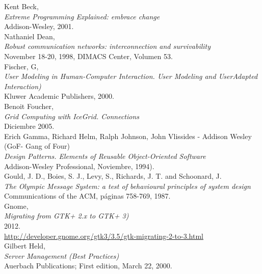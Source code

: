 \begin{thebibliography}{XXX}
     Kent Beck,\\
    \newblock \emph{Extreme Programming Explained: embrace change}\\
    Addison-Wesley, 2001.\\

     Nathaniel Dean,\\
    \newblock \emph{Robust communication networks: interconnection and survivability}\\
    November 18-20, 1998, DIMACS Center, Volumen 53.\\
    
     Fischer, G,\\
    \newblock \emph{User Modeling in Human-Computer Interaction. User Modeling and
    UserAdapted Interaction)}\\
    Kluwer Academic Publishers, 2000.\\
    
     Benoit Foucher,\\
    \newblock \emph{Grid Computing with IceGrid. Connections}\\
    Diciembre 2005.\\
    
     Erich Gamma, Richard Helm, Ralph Johnson, John
    Vlissides - Addison Wesley (GoF- Gang of Four)\\
    \newblock \emph{Design Patterns. Elements of Reusable Object-Oriented Software}\\
    Addison-Wesley Professional, Noviembre, 1994).\\
    
     Gould, J. D., Boies, S. J., Levy, S., Richards, J. T.
   and Schoonard, J.\\
    \newblock \emph{The Olympic Message System: a test of behavioural principles
    of system design}\\
    Communications of the ACM, páginas 758-769, 1987.\\
    
     Gnome,\\
    \newblock \emph{Migrating from GTK+ 2.x to GTK+ 3)}\\
    2012.\\
    \url{http://developer.gnome.org/gtk3/3.5/gtk-migrating-2-to-3.html}\\	
    	
	 Gilbert Held,\\
	\newblock \emph{Server Management (Best Practices)}\\
	Auerbach Publications; First edition, March 22, 2000.\\
	

\end{thebibliography}
